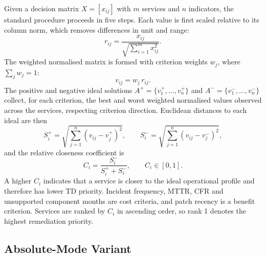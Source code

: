 \documentclass[
  authoryear,
  preprint]{elsarticle}
\begin{document}
Given a decision matrix \(X = [x_{ij}]\) with \(m\) services and \(n\)
indicators, the standard procedure
\citep{hwangMultipleAttributeDecision1981, pandeyReviewTOPSISMethod2023}
proceeds in five steps. Each value is first scaled relative to its
column norm, which removes differences in unit and range:
\begin{equation}\label{eq:norm}
r_{ij} = \frac{x_{ij}}{\sqrt{\sum_{i=1}^{m} x_{ij}^2}}.
\end{equation} The weighted normalised matrix is formed with criterion
weights \(w_j\), where \(\sum_j w_j = 1\):
\begin{equation}\label{eq:weighted}
v_{ij} = w_j \, r_{ij}.
\end{equation} The positive and negative ideal solutions
\(A^{+} = \{v_1^{+}, \ldots, v_n^{+}\}\) and
\(A^{-} = \{v_1^{-}, \ldots, v_n^{-}\}\) collect, for each criterion,
the best and worst weighted normalised values observed across the
services, respecting criterion direction. Euclidean distances to each
ideal are then \begin{equation}\label{eq:dist}
S_i^{+} = \sqrt{\sum_{j=1}^{n}(v_{ij} - v_j^{+})^2}, \qquad
S_i^{-} = \sqrt{\sum_{j=1}^{n}(v_{ij} - v_j^{-})^2},
\end{equation} and the relative closeness coefficient is
\begin{equation}\label{eq:closeness}
C_i = \frac{S_i^{-}}{S_i^{+} + S_i^{-}}, \qquad C_i \in [0, 1].
\end{equation} A higher \(C_i\) indicates that a service is closer to
the ideal operational profile and therefore has lower TD priority.
Incident frequency, MTTR, CFR and unsupported component months are cost
criteria, and patch recency is a benefit criterion. Services are ranked
by \(C_i\) in ascending order, so rank 1 denotes the highest remediation
priority.

\subsection{Absolute-Mode Variant}\label{absolute-mode-variant}
\end{document}

